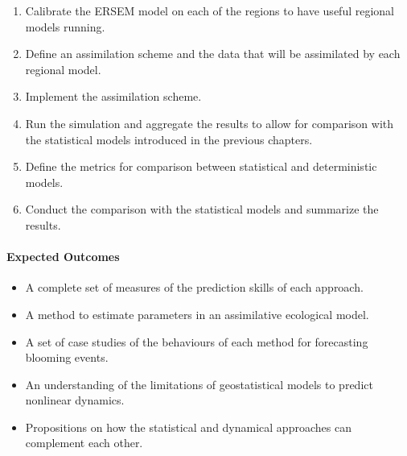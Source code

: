 \begin{enumerate}

\item Calibrate the ERSEM model on each of the regions to have useful
regional models running.

\item Define an assimilation scheme and the data that will be assimilated
by each regional model.

\item Implement the assimilation scheme.

\item Run the simulation and aggregate the results to allow for comparison
with the statistical models introduced in the previous chapters.

\item Define the metrics for comparison between statistical and deterministic
models.

\item Conduct the comparison with the statistical models and summarize
the results.

\end{enumerate}

\paragraph{Expected Outcomes}

\begin{itemize}

\item A complete set of measures of the prediction skills of each approach.

\item A method to estimate parameters in an assimilative ecological model.

\item A set of case studies of the behaviours of each method for forecasting
blooming events.

\item An understanding of the limitations of geostatistical models to predict
nonlinear dynamics. 

\item Propositions on how the statistical and dynamical approaches can
complement each other.

\end{itemize}
